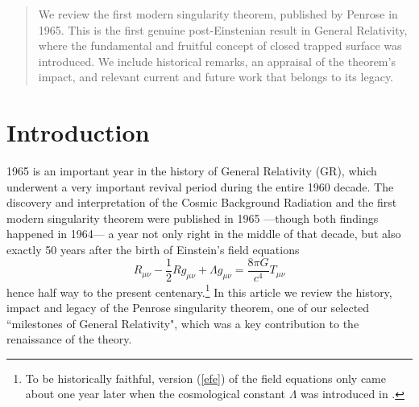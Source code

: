 \documentclass[12pt]{iopart}
\def\be{\begin{equation}}
\def\ee{\end{equation}}
\begin{document}

\author{Jos\'e M M Senovilla}


\address{F\'{\i}sica Te\'orica, Universidad del Pa\'{\i}s Vasco, Apartado 644, 48080 Bilbao, Spain}

\author{David Garfinkle}
\address{Dept. of Physics, Oakland University,
Rochester, MI 48309, USA}
\address{and Michigan Center for Theoretical Physics, Randall Laboratory of Physics, University of Michigan, Ann Arbor, MI 48109-1120, USA}

\begin{abstract}
We review the first modern singularity theorem, published by Penrose in 1965. This is the first genuine post-Einstenian result in General Relativity, where the fundamental and fruitful concept of closed trapped surface was introduced. We include historical remarks, an appraisal of the theorem's impact, and relevant current and future work that belongs to its legacy.
\end{abstract}


\newpage

\section{Introduction}\label{sec:intro}
1965 is an important year in the history of General Relativity (GR), which underwent a very important revival period during the entire 1960 decade. The discovery and interpretation of the Cosmic Background Radiation \cite{PW,DPRW} and the first modern singularity theorem  \cite{P} were published in 1965 ---though both findings happened in 1964--- a year not only right in the middle of that decade, but also exactly 50 years after the birth of Einstein's field equations
\be
R_{\mu\nu} -\frac{1}{2} R g_{\mu\nu} +\Lambda g_{\mu\nu} =\frac{8\pi G}{c^4} T_{\mu\nu} \label{efe}
\ee
hence half way to the present centenary.\footnote{To be historically faithful, version (\ref{efe}) of the field equations only came about one year later when the cosmological constant $\Lambda$ was introduced in \cite{E0}.} In this article we review the history, impact and legacy of the Penrose singularity theorem, one of our selected ``milestones of General Relativity", which was a key contribution to the renaissance of the theory.
\end{document}
